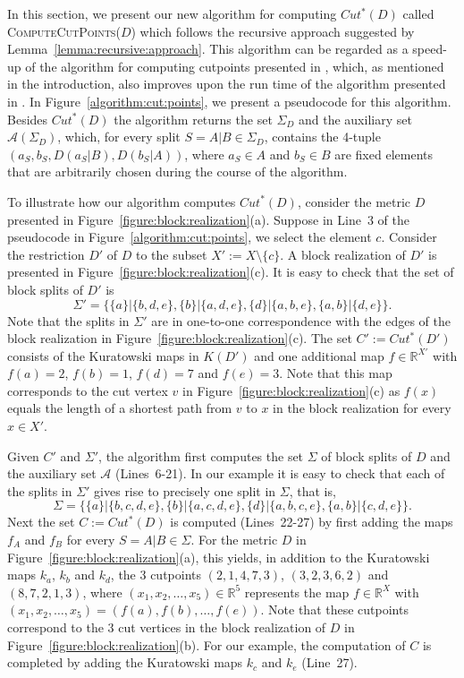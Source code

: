 \documentclass[12pt]{article}
\begin{document}
In this section, we present our new algorithm for computing \(Cut^*(D)\)  
called \textsc{ComputeCutPoints}(\(D\)) which follows the recursive
approach suggested by Lemma~\ref{lemma:recursive:approach}.
This algorithm can be regarded as a speed-up of the algorithm for computing
cutpoints presented in \cite{dress:virtual:cutpoints:2007}, 
which, as mentioned in the introduction, also improves upon the
run time of the algorithm presented in \cite{hertz:varone:cutpoint:partition}.
In Figure~\ref{algorithm:cut:points}, we present a pseudocode
for this algorithm. Besides \(Cut^*(D)\) the algorithm returns
the set \(\Sigma_D\) and the auxiliary set \(\mathcal{A}(\Sigma_D)\),
which, for every split \(S=A|B \in \Sigma_D\), contains
the 4-tuple \((a_S,b_S,D(a_S|B),D(b_S|A))\), where
\(a_S \in A\) and \(b_S \in B\) are fixed elements that are
arbitrarily chosen during the course of the algorithm.

To illustrate how our algorithm 
computes \(Cut^*(D)\), consider the metric \(D\) presented in
Figure~\ref{figure:block:realization}(a). Suppose in Line~3
of the pseudocode in Figure~\ref{algorithm:cut:points}, 
we select the element \(c\). Consider
the restriction \(D'\) of \(D\) to the subset \(X' := X \setminus \{c\}\).
A block realization of \(D'\) is presented in 
Figure~\ref{figure:block:realization}(c). It is easy to check
that the set of block splits of \(D'\) is
\[
\Sigma' = \{\{a\}|\{b,d,e\}, \{b\}|\{a,d,e\}, \{d\}|\{a,b,e\}, \{a,b\}|\{d,e\}\}.
\]
Note that the splits in \(\Sigma'\) are in one-to-one correspondence
with the edges of the block realization in Figure~\ref{figure:block:realization}(c).
The set \(C' := Cut^*(D')\) consists of the Kuratowski maps in \(K(D')\) and
one additional map \(f \in \mathbb{R}^{X'}\) with
\(f(a)=2\), \(f(b)=1\), \(f(d)=7\) and \(f(e)=3\).
Note that this map corresponds to the cut vertex \(v\)
in Figure~\ref{figure:block:realization}(c) as \(f(x)\)
equals the length of a shortest path from \(v\) to
\(x\) in the block realization for every \(x \in X'\).

Given \(C'\) and \(\Sigma'\), the algorithm first computes
the set \(\Sigma\) of block splits of \(D\) and
the auxiliary set \(\mathcal{A}\) (Lines~6-21).
In our example it is easy to check that each of the splits
in \(\Sigma'\) gives rise to precisely one split in 
\(\Sigma\), that is,
\[
\Sigma = \{\{a\}|\{b,c,d,e\}, \{b\}|\{a,c,d,e\}, \{d\}|\{a,b,c,e\}, \{a,b\}|\{c,d,e\}\}.
\]
Next the set \(C := Cut^*(D)\) is computed (Lines~22-27) by first
adding the maps \(f_A\) and \(f_B\) for every \(S =A|B \in \Sigma\).
For the metric \(D\) in Figure~\ref{figure:block:realization}(a), this
yields, in addition to the Kuratowski maps \(k_a\), \(k_b\) and \(k_d\),
the 3 cutpoints
\((2,1,4,7,3)\), \((3,2,3,6,2)\) and \((8,7,2,1,3)\),
where \((x_1,x_2,\dots,x_5) \in \mathbb{R}^5\) represents the
map \(f \in \mathbb{R}^X\) with \((x_1,x_2,\dots,x_5) = (f(a),f(b),\dots,f(e))\).
Note that these cutpoints correspond to the 3 cut vertices in the block realization
of \(D\) in Figure~\ref{figure:block:realization}(b).
For our example, the computation of \(C\) is completed
by adding the Kuratowski maps \(k_c\) and \(k_e\) (Line~27).
\end{document}
